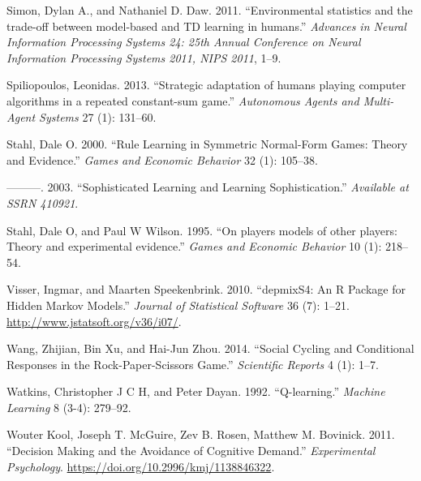 \documentclass[smallextended]{svjour3}       %
\newlength{\cslhangindent}
\newenvironment{CSLReferences}[2] %
 {%
  \setlength{\parindent}{0pt}
  \ifodd #1 \everypar{\setlength{\hangindent}{\cslhangindent}}\ignorespaces\fi
  \ifnum #2 > 0
  \setlength{\parskip}{#2\baselineskip}
  \fi
 }%
 {}
\begin{document}
\begin{CSLReferences}{1}{0}
\leavevmode{}%
Simon, Dylan A., and Nathaniel D. Daw. 2011. {``{Environmental
statistics and the trade-off between model-based and TD learning in
humans}.''} \emph{Advances in Neural Information Processing Systems 24:
25th Annual Conference on Neural Information Processing Systems 2011,
NIPS 2011}, 1--9.

\leavevmode{}%
Spiliopoulos, Leonidas. 2013. {``{Strategic adaptation of humans playing
computer algorithms in a repeated constant-sum game}.''}
\emph{Autonomous Agents and Multi-Agent Systems} 27 (1): 131--60.

\leavevmode{}%
Stahl, Dale O. 2000. {``Rule Learning in Symmetric Normal-Form Games:
Theory and Evidence.''} \emph{Games and Economic Behavior} 32 (1):
105--38.

\leavevmode{}%
---------. 2003. {``Sophisticated Learning and Learning
Sophistication.''} \emph{Available at SSRN 410921}.

\leavevmode{}%
Stahl, Dale O, and Paul W Wilson. 1995. {``{On players models of other
players: Theory and experimental evidence}.''} \emph{Games and Economic
Behavior} 10 (1): 218--54.

\leavevmode{}%
Visser, Ingmar, and Maarten Speekenbrink. 2010. {``{depmixS4}: An {R}
Package for Hidden Markov Models.''} \emph{Journal of Statistical
Software} 36 (7): 1--21. \url{http://www.jstatsoft.org/v36/i07/}.

\leavevmode{}%
Wang, Zhijian, Bin Xu, and Hai-Jun Zhou. 2014. {``Social Cycling and
Conditional Responses in the Rock-Paper-Scissors Game.''}
\emph{Scientific Reports} 4 (1): 1--7.

\leavevmode{}%
Watkins, Christopher J C H, and Peter Dayan. 1992. {``{Q-learning}.''}
\emph{Machine Learning} 8 (3-4): 279--92.

\leavevmode{}%
Wouter Kool, Joseph T. McGuire, Zev B. Rosen, Matthew M. Bovinick. 2011.
{``{Decision Making and the Avoidance of Cognitive Demand}.''}
\emph{Experimental Psychology}.
\url{https://doi.org/10.2996/kmj/1138846322}.

\end{CSLReferences}




\end{document}
